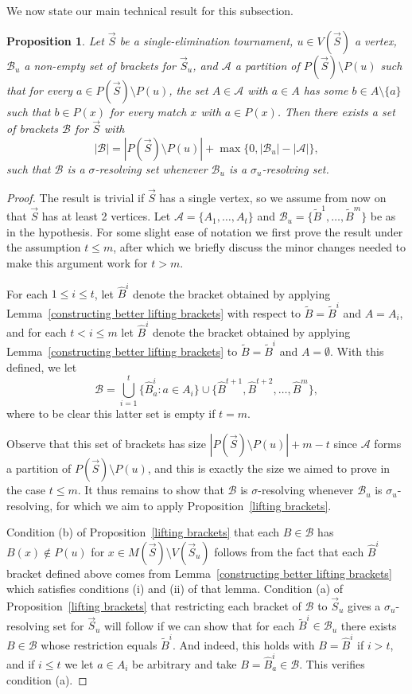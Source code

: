 \documentclass[12pt,letterpaper]{article}
\newtheorem{prop}[thm]{Proposition}
\theoremstyle{definition}
\newcommand{\sig}{\sigma}
\renewcommand{\1}{\mathbbm{1}}
\newcommand{\sm}{\setminus}
\renewcommand{\c}[1]{\mathcal{#1}}
\newcommand{\tour}{\vec{S}}
\begin{document}
We now state our main technical result for this subsection.

\begin{prop}\label{metric upper bound given partition}
	Let $\tour$ be a single-elimination tournament, $u\in V(\tour)$ a vertex, $\c{B}_u$ a non-empty set of brackets for $\tour_u$, and $\c{A}$ a partition of $P(\tour)\sm P(u)$ such that for every $a\in P(\tour)\sm P(u)$, the set $A\in \c{A}$ with $a\in A$ has some $b\in A\sm \{a\}$ such that $b\in P(x)$ for every match $x$ with $a\in P(x)$.  Then there exists a set of brackets $\c{B}$ for $\tour$ with
	\[|\c{B}|= |P(\tour)\sm P(u)|+\max\{0,|\c{B}_u|-|\c{A}|\},\]
	such that $\c{B}$ is a $\sig$-resolving set whenever $\c{B}_u$ is a $\sig_u$-resolving set.
\end{prop}
\begin{proof}
	The result is trivial if $\tour$ has a single vertex, so we assume from now on that $\tour$ has at least 2 vertices.  Let $\c{A}=\{A_1,\ldots,A_t\}$ and $\c{B}_u=\{\widetilde{B}^1,\ldots,\widetilde{B}^m\}$ be as in the hypothesis.  For some slight ease of notation we first prove the result under the assumption $t\le m$, after which we briefly discuss the minor changes needed to make this argument work for $t>m$.
	
	For each $1\le i \le t$, let $\widehat{B}^i$ denote the bracket obtained by applying Lemma~\ref{constructing better lifting brackets} with respect to $\widetilde{B}=\widetilde{B}^{i}$ and $A=A_i$, and for each $t<i\le m$ let $\widehat{B}^i$ denote the bracket obtained by applying Lemma~\ref{constructing better lifting brackets} to $\widetilde{B}=\widetilde{B}^i$ and $A=\emptyset$.  With this defined, we let
	\[\c{B}=\bigcup_{i=1}^t\{\widehat{B}_a^{i}:a\in A_i\}\cup \{\widehat{B}^{t+1},\widehat{B}^{t+2},\ldots,\widehat{B}^m\},\]
	where to be clear this latter set is empty if $t=m$.
	
	Observe that this set of brackets has size $|P(\tour)\sm P(u)|+m-t$ since $\c{A}$ forms a partition of $P(\tour)\sm P(u)$, and this is exactly the size we aimed to prove in the case $t\le m$.  It thus remains to show that $\c{B}$ is $\sig$-resolving whenever $\c{B}_u$ is $\sig_u$-resolving, for which we aim to apply Proposition~\ref{lifting brackets}.
	
	Condition (b) of Proposition~\ref{lifting brackets} that each $B\in \c{B}$ has $B(x)\notin P(u)$ for $x\in M(\tour)\sm V(\tour_u)$ follows from the fact that each $\widehat{B}^i$ bracket defined above comes from Lemma~\ref{constructing better lifting brackets} which satisfies conditions (i) and (ii) of that lemma.  Condition (a) of Proposition~\ref{lifting brackets} that restricting each bracket of $\c{B}$ to $\tour_u$ gives a $\sig_u$-resolving set for $\tour_u$ will follow if we can show that for each $\widetilde{B}^i\in \c{B}_u$  there exists $B\in \c{B}$ whose restriction equals $\widetilde{B}^i$.  And indeed, this holds with $B=\widehat{B}^i$ if $i>t$, and if $i\le t$ we let $a\in A_i$ be arbitrary and take $B=\widehat{B}^{i}_a\in \c{B}$.  This verifies condition (a).
	

\end{proof}
\end{document}
